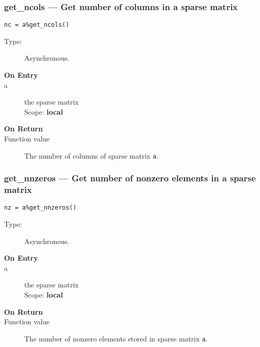 \subsubsection{get\_ncols --- Get number of  columns in a  sparse
  matrix}

\begin{verbatim}
nc = a%get_ncols()
\end{verbatim}

\begin{description}
\item[Type:] Asynchronous.
\item[\bf On Entry]
\item[a] the sparse matrix\\
Scope: {\bf local}\\
\end{description}

\begin{description}
\item[\bf On Return]
\item[Function value] The number of  columns  of sparse matrix \verb|a|.
\end{description}


\subsubsection{get\_nnzeros --- Get number of nonzero elements
  in a sparse matrix}

\begin{verbatim}
nz = a%get_nnzeros()
\end{verbatim}

\begin{description}
\item[Type:] Asynchronous.
\item[\bf On Entry]
\item[a] the sparse matrix\\
Scope: {\bf local}\\
\end{description}

\begin{description}
\item[\bf On Return]
\item[Function value] The number of nonzero elements stored in sparse matrix \verb|a|.
\end{description}

